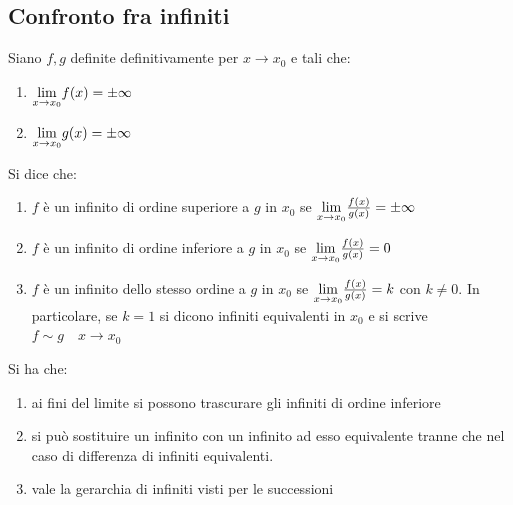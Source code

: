 \documentclass[12pt]{report}
\begin{document}
	\subsection{Confronto fra infiniti}
	Siano $f,g$ definite definitivamente per $x \to x_0$ e tali che:
	\begin{enumerate}
		\item $\mathlarger{\lim_{x \to x_0}}f(x) = \pm\infty$
		\item $\mathlarger{\lim_{x \to x_0}}g(x) = \pm\infty$
	\end{enumerate}
	Si dice che:
	\begin{enumerate}
		\item $f$ è un infinito di ordine superiore a $g$ in $x_0$ se $\mathlarger{\lim_{x \to x_0}}\frac{f(x)}{g(x)} = \pm\infty$
		\item $f$ è un infinito di ordine inferiore a  $g$ in $x_0$ se $\mathlarger{\lim_{x \to x_0}}\frac{f(x)}{g(x)} = 0$
		\item $f$ è un infinito dello stesso ordine a $g$ in $x_0$ se $\mathlarger{\lim_{x \to x_0}}\frac{f(x)}{g(x)} = k$ con $k \neq 0$. In particolare, se $k = 1$ si dicono infiniti equivalenti in $x_0$ e si scrive $f  \sim g \quad x \to x_0$
	\end{enumerate}
	Si ha che:
	\begin{enumerate}
		\item ai fini del limite si possono trascurare gli infiniti di ordine inferiore
		\item si può sostituire un infinito con un infinito ad esso equivalente tranne che nel caso di differenza di infiniti equivalenti.
		\item vale la gerarchia di infiniti visti per le successioni
	\end{enumerate}
\end{document}
